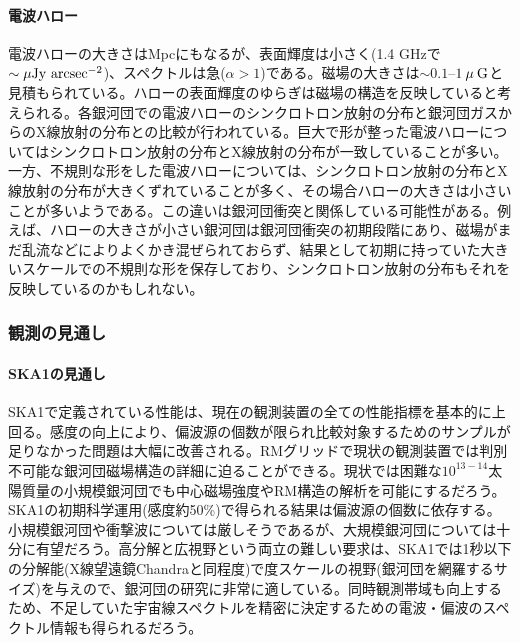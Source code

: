 \paragraph{電波ハロー} 

電波ハローの大きさはMpcにもなるが、表面輝度は小さく(1.4 GHzで$\sim \mu \rm Jy~arcsec^{-2}$)、スペクトルは急($\alpha>1$)である\citep{2012A&ARv..20...54F}。磁場の大きさは$\sim 0.1$--$1\:\rm \mu\: G$と見積もられている。ハローの表面輝度のゆらぎは磁場の構造を反映していると考えられる。各銀河団での電波ハローのシンクロトロン放射の分布と銀河団ガスからのX線放射の分布との比較が行われている。巨大で形が整った電波ハローについてはシンクロトロン放射の分布とX線放射の分布が一致していることが多い\citep{2012A&ARv..20...54F}。一方、不規則な形をした電波ハローについては、シンクロトロン放射の分布とX線放射の分布が大きくずれていることが多く、その場合ハローの大きさは小さいことが多いようである\citep{2012A&ARv..20...54F}。この違いは銀河団衝突と関係している可能性がある。例えば、ハローの大きさが小さい銀河団は銀河団衝突の初期段階にあり、磁場がまだ乱流などによりよくかき混ぜられておらず、結果として初期に持っていた大きいスケールでの不規則な形を保存しており、シンクロトロン放射の分布もそれを反映しているのかもしれない。

\subsubsection{観測の見通し}
\label{c06.s2.ss5.sss2}

\paragraph{SKA1の見通し}

SKA1で定義されている性能は、現在の観測装置の全ての性能指標を基本的に上回る。感度の向上により、偏波源の個数が限られ比較対象するためのサンプルが足りなかった問題は大幅に改善される。RMグリッドで現状の観測装置では判別不可能な銀河団磁場構造の詳細に迫ることができる。現状では困難な$10^{13-14}$太陽質量の小規模銀河団でも中心磁場強度やRM構造の解析を可能にするだろう。SKA1の初期科学運用(感度約50\%)で得られる結果は偏波源の個数に依存する。小規模銀河団や衝撃波については厳しそうであるが、大規模銀河団については十分に有望だろう。高分解と広視野という両立の難しい要求は、SKA1では1秒以下の分解能(X線望遠鏡Chandraと同程度)で度スケールの視野(銀河団を網羅するサイズ)を与えので、銀河団の研究に非常に適している。同時観測帯域も向上するため、不足していた宇宙線スペクトルを精密に決定するための電波・偏波のスペクトル情報も得られるだろう。

